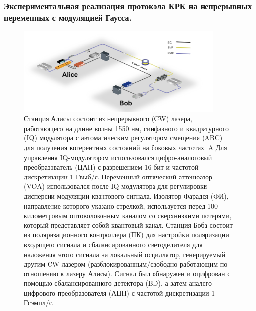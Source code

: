 \subsubsection{Экспериментальная реализация протокола КРК на непрерывных переменных с модуляцией Гаусса.}
\begin{figure}
    \centering
    \includegraphics[width=0.9\textwidth]{images/QKD CV LLO.png}
    \caption{Станция Алисы состоит из непрерывного (CW) лазера, работающего на длине волны 1550 нм, синфазного и квадратурного (IQ) модулятора с автоматическим регулятором смещения (ABC) для получения когерентных состояний на боковых частотах. A Для управления IQ-модулятором использовался цифро-аналоговый преобразователь (ЦАП) с разрешением 16 бит и частотой дискретизации 1 Гвыб/с. Переменный оптический аттенюатор (VOA) использовался после IQ-модулятора для регулировки дисперсии модуляции квантового сигнала. Изолятор Фарадея (ФИ), направление которого указано стрелкой, используется перед 100-километровым оптоволоконным каналом со сверхнизкими потерями, который представляет собой квантовый канал. Станция Боба состоит из поляризационного контроллера (ПК) для настройки поляризации входящего сигнала и сбалансированного светоделителя для наложения этого сигнала на локальный осциллятор, генерируемый другим CW-лазером (разблокированным/свободно работающим по отношению к лазеру Алисы). Сигнал был обнаружен и оцифрован с помощью сбалансированного детектора (BD), а затем аналого-цифрового преобразователя (АЦП) с частотой дискретизации 1 Гсэмпл/с.}
    \label{fig:CV QKD ЛЛО lit}
\end{figure}
